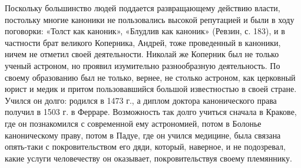 Поскольку большинство  людей поддается развращающему  действию власти,
постольку многие каноники не пользовались  высокой репутацией и были в
ходу поговорки: «Толст как каноник», «Блудлив как каноник» (Ревзин, с.
183), и в частности брат  великого Коперника, Андрей, тоже проведенный
в каноники, ничем  не отметил своей деятельности.  Николай же Коперник
был не  только ученый  астроном, но проявил  изумительно разнообразную
деятельность. По своему образованию был  не только, вернее, не столько
астроном, как церковный юрист и  медик и притом пользовавшийся большой
известностью в  своей стране. Учился  он долго:  родился в 1473  г., а
диплом  доктора  канонического права  получил  в  1503 г.  в  Ферраре.
Возможность так долго учиться сначала в Кракове, где он познакомился с
современной  ему астрономией,  потом  в  Болонье каноническому  праву,
потом  в Падуе,  где он  учился  медицине, была  связана опять-таки  с
покровительством его  дяди, который, наверное, и  не подозревал, какие
услуги человечеству он оказывает, покровительствуя своему племяннику.

